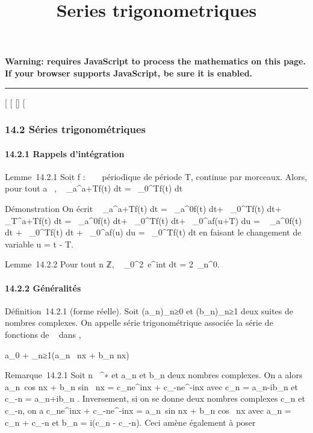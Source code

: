 \documentclass[]{article}
\title{Series trigonometriques}
\author{}
\date{}
\begin{document}
\maketitle

\textbf{Warning: 
requires JavaScript to process the mathematics on this page.\\ If your
browser supports JavaScript, be sure it is enabled.}

\begin{center}\rule{3in}{0.4pt}\end{center}

{[}
{[}
{[}{]}
{[}

\subsubsection{14.2 Séries trigonométriques}

\paragraph{14.2.1 Rappels d'intégration}

Lemme~14.2.1 Soit f : ~ \rightarrow~  périodique de période T, continue par
morceaux. Alors, pour tout a \in {}~, \int ~
\_a^a+Tf(t) dt =\int ~
\_0^Tf(t) dt

Démonstration On écrit \int ~
\_a^a+Tf(t) dt =\int ~
\_a^0f(t) dt+\int ~
\_0^Tf(t) dt+\int ~
\_T^a+Tf(t) dt =\int ~
\_a^0f(t) dt+\int ~
\_0^Tf(t) dt+\int ~
\_0^af(u+T) du = \int ~
\_a^0f(t) dt +\int ~
\_0^Tf(t) dt +\int ~
\_0^af(u) du =\int ~
\_0^Tf(t) dt en faisant le changement de variable u = t -
T.

Lemme~14.2.2 Pour tout n \in ℤ, \int ~
\_0^2\pi~e^int dt = 2\pi~\delta\_n^0.

\paragraph{14.2.2 Généralités}

Définition~14.2.1 (forme réelle). Soit (a\_n)\_n≥0 et
(b\_n)\_n≥1 deux suites de nombres complexes. On appelle
série trigonométrique associée la série de fonctions de ~ dans ,

a\_0 + \sum \_n≥1(a\_n~
\cos nx + b\_n \sin nx)

Remarque~14.2.1 Soit n \in {}~^∗ et a\_n et b\_n
deux nombres complexes. On a alors a\_n\
cos nx + b\_n sin~ nx =
c\_ne^inx + c\_-ne^-inx avec
c\_n = a\_n-ib\_n  et
c\_-n = a\_n+ib\_n \over 2 .
Inversement, si on se donne deux nombres complexes c\_n et
c\_-n, on a c\_ne^inx +
c\_-ne^-inx = a\_n\
sin nx + b\_n cos~ nx avec
a\_n = c\_n + c\_-n et b\_n =
i(c\_n - c\_-n). Ceci amène également à poser
\end{document}
